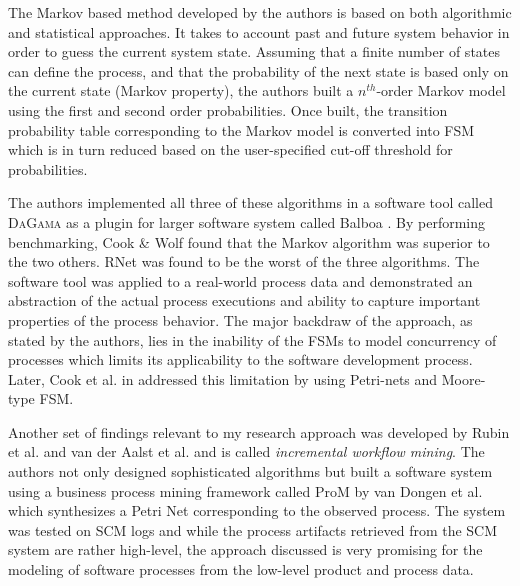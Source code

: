 \documentclass{sig-alternate}
\begin{document}
The Markov based method developed by the authors is based on both algorithmic and statistical approaches. It takes to account past and future system behavior in order to guess the current system state. Assuming that a finite number of states can define the process, and that the probability of the next state is based only on the current state (Markov property), the authors built a $n^{th}$-order Markov model using the first and second order probabilities. Once built, the transition probability table corresponding to the Markov model is converted into FSM which is in turn reduced based on the user-specified cut-off threshold for probabilities.

The authors implemented all three of these algorithms in a software tool called \textsc{DaGama} as a plugin for larger software system called Balboa \cite{citeulike:5120757}. By performing benchmarking, Cook \& Wolf found that the Markov algorithm was superior to the two others. RNet was found to be the worst of the three algorithms. The software tool was applied to a real-world process data and demonstrated an abstraction of the actual process executions and ability to capture important properties of the process behavior. The major backdraw of the approach, as stated by the authors, lies in the inability of the FSMs to model concurrency of processes which limits its applicability to the software development process. Later, Cook et al. in \cite{citeulike:5128143} addressed this limitation by using Petri-nets and Moore-type FSM.

Another set of findings relevant to my research approach was developed by Rubin et al. \cite{citeulike:1885717} and van der Aalst et al. \cite{citeulike:3718014} and is called \textit{incremental workflow mining}. The authors not only designed sophisticated algorithms but built a software system using a business process mining framework called ProM by van Dongen et al. \cite{citeulike:5043673} which synthesizes a Petri Net corresponding to the observed process. The system was tested on SCM logs and while the process artifacts retrieved from the SCM system are rather high-level, the approach discussed is very promising for the modeling of software processes from the low-level product and process data.
\end{document}
